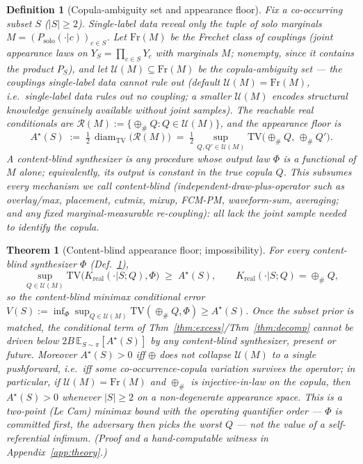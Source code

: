 \documentclass[11pt]{article}
\newtheorem{definition}{Definition}
\newtheorem{theorem}{Theorem}
\begin{document}
\begin{definition}[Copula-ambiguity set and appearance floor]\label{def:ambiguity}
Fix a co-occurring subset $S$ ($|S|\ge2$). Single-label data reveal only the tuple of solo
marginals $M=(P_{\mathrm{solo}}(\cdot|c))_{c\in S}$. Let $\mathrm{Fr}(M)$ be the Frechet class of
couplings (joint appearance laws on $Y_S=\prod_{c\in S}Y_c$ with marginals $M$; nonempty, since it
contains the product $P_S$), and let $\mathcal U(M)\subseteq\mathrm{Fr}(M)$ be the
\emph{copula-ambiguity set} --- the couplings single-label data cannot rule out (default
$\mathcal U(M)=\mathrm{Fr}(M)$, i.e.\ single-label data rules out no coupling; a smaller
$\mathcal U(M)$ encodes structural knowledge genuinely available without joint samples). The
reachable real conditionals are $\mathcal R(M):=\{\oplus_{\#}Q:Q\in\mathcal U(M)\}$, and the
\emph{appearance floor} is
\[
A^\star(S)\;:=\;\tfrac12\,\operatorname{diam}_{\mathrm{TV}}\!\big(\mathcal R(M)\big)
\;=\;\tfrac12\sup_{Q,Q'\in\mathcal U(M)}\mathrm{TV}\big(\oplus_{\#}Q,\,\oplus_{\#}Q'\big).
\]
A content-blind synthesizer is any procedure whose output law $\Phi$ is a functional of $M$ alone;
equivalently, its output is \emph{constant in} the true copula $Q$. This subsumes every mechanism
we call content-blind (independent-draw-plus-operator such as overlay/max, placement, cutmix,
mixup, FCM-PM, waveform-sum, averaging; and any fixed marginal-measurable re-coupling): all lack
the joint sample needed to identify the copula.
\end{definition}

\begin{theorem}[Content-blind appearance floor; impossibility]\label{thm:l1floor}
For \emph{every} content-blind synthesizer $\Phi$ (Def.~\ref{def:ambiguity}),
\[
\sup_{Q\in\mathcal U(M)}\mathrm{TV}\big(K_{\mathrm{real}}(\cdot|S;Q),\Phi\big)\;\ge\;A^\star(S),
\qquad K_{\mathrm{real}}(\cdot|S;Q)=\oplus_{\#}Q,
\]
so the content-blind minimax conditional error
$V(S):=\inf_{\Phi}\sup_{Q\in\mathcal U(M)}\mathrm{TV}(\oplus_{\#}Q,\Phi)\ge A^\star(S)$. Once the
subset prior is matched, the conditional term of Thm~\ref{thm:excess}/Thm~\ref{thm:decomp} cannot
be driven below $2B\,\mathbb{E}_{S\sim\pi}[A^\star(S)]$ by any content-blind synthesizer, present
or future. Moreover $A^\star(S)>0$ iff $\oplus$ does not collapse $\mathcal U(M)$ to a single
pushforward, i.e.\ iff some co-occurrence-copula variation \emph{survives} the operator; in
particular, if $\mathcal U(M)=\mathrm{Fr}(M)$ and $\oplus_{\#}$ is injective-in-law on the copula,
then $A^\star(S)>0$ whenever $|S|\ge2$ on a non-degenerate appearance space. This is a two-point
(Le Cam) minimax bound with the operating quantifier order --- $\Phi$ is committed first, the
adversary then picks the worst $Q$ --- not the value of a self-referential infimum. (Proof and a
hand-computable witness in Appendix~\ref{app:theory}.)
\end{theorem}
\end{document}
